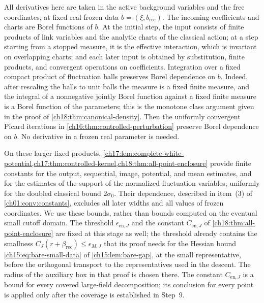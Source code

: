 All derivatives here are taken in the active background variables and the free coordinates, at fixed real frozen data $b=(\xi,b_{\mathrm{rec}})$. The incoming coefficients and charts are Borel functions of $b$. At the initial step, the input consists of finite products of link variables and the analytic charts of the classical action; at a step starting from a stopped measure, it is the effective interaction, which is invariant on overlapping charts; and each later input is obtained by substitution, finite products, and convergent operations on coefficients. Integration over a fixed compact product of fluctuation balls preserves Borel dependence on $b$. Indeed, after rescaling the balls to unit balls the measure is a fixed finite measure, and the integral of a nonnegative jointly Borel function against a fixed finite measure is a Borel function of the parameters; this is the monotone class argument given in the proof of \cref{ch18:thm:canonical-density}. Then the uniformly convergent Picard iterations in \cref{ch16:thm:controlled-perturbation} preserve Borel dependence on $b$. No derivative in a frozen real parameter is needed.

On these larger fixed products, \cref{ch17:lem:complete-white-potential,ch17:thm:controlled-kernel,ch18:thm:all-point-enclosure} provide finite constants for the output, sequential, image, potential, and mean estimates, and for the estimates of the support of the normalized fluctuation variables, uniformly for the doubled classical bound $2\sigma_0$. Their dependence, described in item~(3) of \cref{ch01:conv:constants}, excludes all later widths and all values of frozen coordinates. We use these bounds, rather than bounds computed on the eventual small cutoff domain. The threshold $\epsilon_{\mathrm{en},J}$ and the constant $C_{\mathrm{en},J}$ of \cref{ch18:thm:all-point-enclosure} are fixed at this stage as well; the threshold already contains the smallness $C_J(r+\beta_{\mathrm{rec}})\le\epsilon_{M,J}$ that its proof needs for the Hessian bound \eqref{ch15:eq:bare-small-data} of \cref{ch15:lem:bare-gap}, at the small representative, before the orthogonal transport to the representatives used in the descent. The radius of the auxiliary box in that proof is chosen there. The constant $C_{\mathrm{en},J}$ is a bound for every covered large-field decomposition; its conclusion for every point is applied only after the coverage is established in Step~9.

